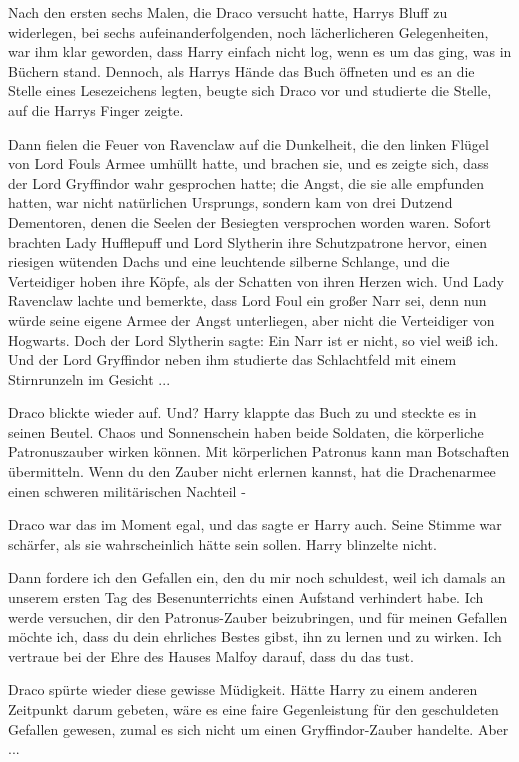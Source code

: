 Nach den ersten sechs Malen, die Draco versucht hatte, Harrys Bluff zu
widerlegen, bei sechs aufeinanderfolgenden, noch lächerlicheren Gelegenheiten,
war ihm klar geworden, dass Harry einfach nicht log, wenn es um das ging, was in
Büchern stand. Dennoch, als Harrys Hände das Buch öffneten und es an die Stelle
eines Lesezeichens legten, beugte sich Draco vor und studierte die Stelle, auf
die Harrys Finger zeigte.

Dann fielen die Feuer von Ravenclaw auf die Dunkelheit, die den linken Flügel
von Lord Fouls Armee umhüllt hatte, und brachen sie, und es zeigte sich, dass
der Lord Gryffindor wahr gesprochen hatte; die Angst, die sie alle empfunden
hatten, war nicht natürlichen Ursprungs, sondern kam von drei Dutzend
Dementoren, denen die Seelen der Besiegten versprochen worden waren. Sofort
brachten Lady Hufflepuff und Lord Slytherin ihre Schutzpatrone hervor, einen
riesigen wütenden Dachs und eine leuchtende silberne Schlange, und die
Verteidiger hoben ihre Köpfe, als der Schatten von ihren Herzen wich. Und Lady
Ravenclaw lachte und bemerkte, dass Lord Foul ein großer Narr sei, denn nun
würde seine eigene Armee der Angst unterliegen, aber nicht die Verteidiger von
Hogwarts. Doch der Lord Slytherin sagte: \glqq{}Ein Narr ist er nicht, so viel
weiß ich.\grqq{} Und der Lord Gryffindor neben ihm studierte das Schlachtfeld
mit einem Stirnrunzeln im Gesicht ...

Draco blickte wieder auf. \glqq{}Und?\grqq{} Harry klappte das Buch zu und
steckte es in seinen Beutel. \glqq{}Chaos und Sonnenschein haben beide Soldaten,
die körperliche Patronuszauber wirken können. Mit körperlichen Patronus kann man
Botschaften übermitteln. Wenn du den Zauber nicht erlernen kannst, hat die
Drachenarmee einen schweren militärischen Nachteil -\grqq{}

Draco war das im Moment egal, und das sagte er Harry auch. Seine Stimme war
schärfer, als sie wahrscheinlich hätte sein sollen. Harry blinzelte nicht.

\glqq{}Dann fordere ich den Gefallen ein, den du mir noch schuldest, weil ich
damals an unserem ersten Tag des Besenunterrichts einen Aufstand verhindert
habe. Ich werde versuchen, dir den Patronus-Zauber beizubringen, und für meinen
Gefallen möchte ich, dass du dein ehrliches Bestes gibst, ihn zu lernen und zu
wirken. Ich vertraue bei der Ehre des Hauses Malfoy darauf, dass du das
tust.\grqq{}

Draco spürte wieder diese gewisse Müdigkeit. Hätte Harry zu einem anderen
Zeitpunkt darum gebeten, wäre es eine faire Gegenleistung für den geschuldeten
Gefallen gewesen, zumal es sich nicht um einen Gryffindor-Zauber handelte.
Aber ...

